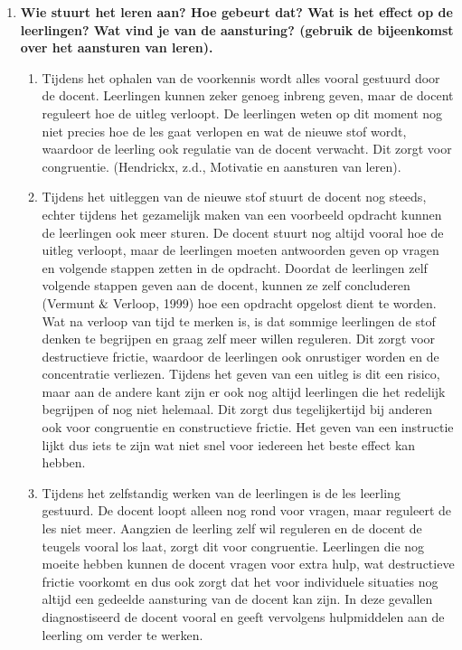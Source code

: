 \documentclass{article}
\begin{document}
\begin{enumerate}[label=(\alph*)]
\begin{enumerate}[label=\arabic*.]
                    \end{enumerate}
                \item \textbf{Wie stuurt het leren aan? Hoe gebeurt dat? Wat is het effect op de leerlingen? Wat vind je van de aansturing? (gebruik de bijeenkomst over het aansturen van leren).} \\
                    \begin{enumerate}[label=\arabic*.]
                        \item Tijdens het ophalen van de voorkennis wordt alles vooral gestuurd door de docent. Leerlingen kunnen zeker genoeg inbreng geven, maar de docent reguleert hoe de uitleg verloopt. De leerlingen weten op dit moment nog niet precies hoe de les gaat verlopen en wat de nieuwe stof wordt, waardoor de leerling ook regulatie van de docent verwacht. Dit zorgt voor congruentie. (Hendrickx, z.d., Motivatie en aansturen van leren).
                        \item Tijdens het uitleggen van de nieuwe stof stuurt de docent nog steeds, echter tijdens het gezamelijk maken van een voorbeeld opdracht kunnen de leerlingen ook meer sturen. De docent stuurt nog altijd vooral hoe de uitleg verloopt, maar de leerlingen moeten antwoorden geven op vragen en volgende stappen zetten in de opdracht. Doordat de leerlingen zelf volgende stappen geven aan de docent, kunnen ze zelf concluderen (Vermunt$\And$Verloop, 1999) hoe een opdracht opgelost dient te worden. Wat na verloop van tijd te merken is, is dat sommige leerlingen de stof denken te begrijpen en graag zelf meer willen reguleren. Dit zorgt voor destructieve frictie, waardoor de leerlingen ook onrustiger worden en de concentratie verliezen. Tijdens het geven van een uitleg is dit een risico, maar aan de andere kant zijn er ook nog altijd leerlingen die het redelijk begrijpen of nog niet helemaal. Dit zorgt dus tegelijkertijd bij anderen ook voor congruentie en constructieve frictie. Het geven van een instructie lijkt dus iets te zijn wat niet snel voor iedereen het beste effect kan hebben.
                        \item Tijdens het zelfstandig werken van de leerlingen is de les leerling gestuurd. De docent loopt alleen nog rond voor vragen, maar reguleert de les niet meer. Aangzien de leerling zelf wil reguleren en de docent de teugels vooral los laat, zorgt dit voor congruentie. Leerlingen die nog moeite hebben kunnen de docent vragen voor extra hulp, wat destructieve frictie voorkomt en dus ook zorgt dat het voor individuele situaties nog altijd een gedeelde aansturing van de docent kan zijn. In deze gevallen diagnostiseerd de docent vooral en geeft vervolgens hulpmiddelen aan de leerling om verder te werken.

\end{enumerate}
\end{enumerate}
\end{document}
